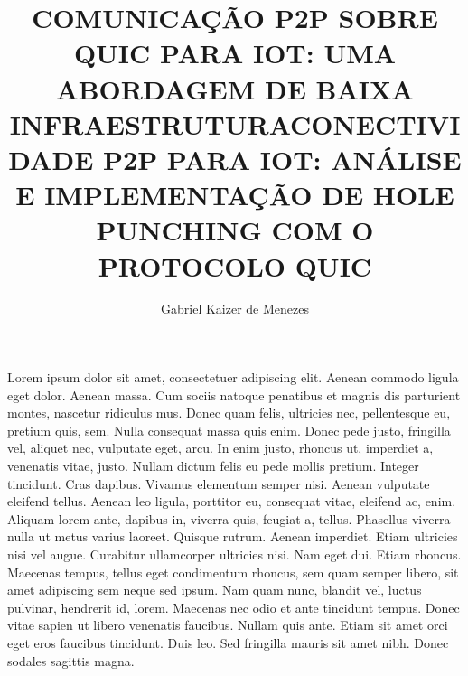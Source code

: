 \documentclass[portuguese, oneside]{pucrs-ppgcc}
\author{Gabriel Kaizer de Menezes}
\title{COMUNICAÇÃO P2P SOBRE QUIC PARA IOT: UMA ABORDAGEM DE BAIXA INFRAESTRUTURA}{P2P COMMUNICATION OVER QUIC FOR IOT: A LOW-INFRASTRUCTURE APPROACH}
\title{CONECTIVIDADE P2P PARA IOT: ANÁLISE E IMPLEMENTAÇÃO DE HOLE PUNCHING COM O PROTOCOLO QUIC}{}
\begin{document}
\begin{agradecimentos}

  Lorem ipsum dolor sit amet, consectetuer adipiscing elit. Aenean commodo ligula eget dolor. Aenean massa. Cum sociis natoque penatibus et magnis dis parturient montes, nascetur ridiculus mus. Donec quam felis, ultricies nec, pellentesque eu, pretium quis, sem. Nulla consequat massa quis enim. Donec pede justo, fringilla vel, aliquet nec, vulputate eget, arcu. In enim justo, rhoncus ut, imperdiet a, venenatis vitae, justo. Nullam dictum felis eu pede mollis pretium. Integer tincidunt. Cras dapibus. Vivamus elementum semper nisi. Aenean vulputate eleifend tellus. Aenean leo ligula, porttitor eu, consequat vitae, eleifend ac, enim. Aliquam lorem ante, dapibus in, viverra quis, feugiat a, tellus. Phasellus viverra nulla ut metus varius laoreet. Quisque rutrum. Aenean imperdiet. Etiam ultricies nisi vel augue. Curabitur ullamcorper ultricies nisi. Nam eget dui. Etiam rhoncus. Maecenas tempus, tellus eget condimentum rhoncus, sem quam semper libero, sit amet adipiscing sem neque sed ipsum. Nam quam nunc, blandit vel, luctus pulvinar, hendrerit id, lorem. Maecenas nec odio et ante tincidunt tempus. Donec vitae sapien ut libero venenatis faucibus. Nullam quis ante. Etiam sit amet orci eget eros faucibus tincidunt. Duis leo. Sed fringilla mauris sit amet nibh. Donec sodales sagittis magna.






\end{agradecimentos}
\end{document}
